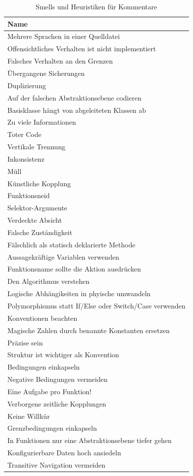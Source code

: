 \begin{table}[h]
	\centering
		 \begin{tabular}{ | l | }
		 \hline
			Name \\  \hline
			Mehrere Sprachen in einer Quelldatei \\
			Offensichtliches Verhalten ist nicht implementiert \\
			Falsches Verhalten an den Grenzen \\
			Übergangene Sicherungen \\
			Duplizierung \\
			Auf der falschen Abstraktionsebene codieren \\
			Basisklasse hängt von abgeleiteten Klassen ab \\
			Zu viele Informationen \\
			Toter Code \\
			Vertikale Trennung \\
			Inkonsistenz \\
			Müll \\
			Künstliche Kopplung \\
			Funktionsneid \\
			Selektor-Argumente \\
			Verdeckte Absicht \\
			Falsche Zuständigkeit \\
			Fälschlich als statisch deklarierte Methode \\
			Aussagekräftige Variablen verwenden \\
			Funktionsname sollte die Aktion ausdrücken \\
			Den Algorithmus verstehen \\
			Logische Abhängikeiten in phyische umwandeln \\
			Polymorphismus statt If/Else oder Switch/Case verwenden \\
			Konventionen beachten \\
			Magische Zahlen durch benannte Konstanten ersetzen \\
			Präzise sein \\
			Struktur ist wichtiger als Konvention \\
			Bedingungen einkapseln \\
			Negative Bedingungen vermeiden \\
			Eine Aufgabe pro Funktion! \\
			Verborgene zeitliche Kopplungen \\
			Keine Willkür \\
			Grenzbedingungen einkapseln \\
			In Funktionen nur eine Abstraktionsebene tiefer gehen \\
			Konfigurierbare Daten hoch ansiedeln \\
			Transitive Navigation vermeiden \\ \hline
		\end{tabular}
	\caption{Smells und Heuristiken für Kommentare}
	\label{tab:SmellsUndHeuristiken_Comments}
\end{table}

